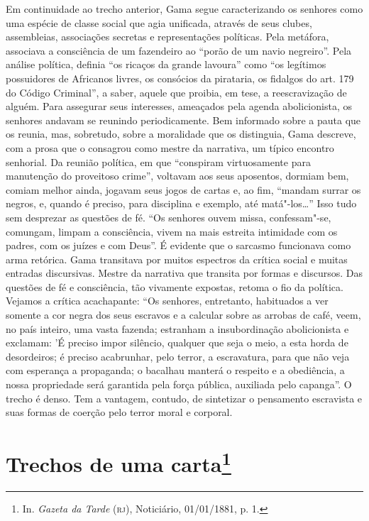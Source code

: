 {\small\noindent
Em continuidade ao trecho anterior, Gama segue caracterizando os
senhores como uma espécie de classe social que agia unificada, através
de seus clubes, assembleias, associações secretas e representações
políticas. Pela metáfora, associava a consciência de um fazendeiro ao
``porão de um navio negreiro''. Pela análise política, definia ``os ricaços
da grande lavoura'' como ``os legítimos possuidores de Africanos livres,
os consócios da pirataria, os fidalgos do art. 179 do Código Criminal'',
a saber, aquele que proibia, em tese, a reescravização de alguém. Para
assegurar seus interesses, ameaçados pela agenda abolicionista, os
senhores andavam se reunindo periodicamente. Bem informado sobre a pauta
que os reunia, mas, sobretudo, sobre a moralidade que os distinguia, Gama
descreve, com a prosa que o consagrou como mestre da narrativa, um
típico encontro senhorial. Da reunião política, em que ``conspiram
virtuosamente para manutenção do proveitoso crime'', voltavam aos seus
aposentos, dormiam bem, comiam melhor ainda, jogavam seus jogos de
cartas e, ao fim, ``mandam surrar os negros, e, quando é preciso, para
disciplina e exemplo, até matá"-los\ldots{}'' Isso tudo sem desprezar as
questões de fé. ``Os senhores ouvem missa, confessam"-se, comungam, limpam
a consciência, vivem na mais estreita intimidade com os padres, com os
juízes e com Deus''. É evidente que o sarcasmo funcionava como arma
retórica. Gama transitava por muitos espectros da crítica social e
muitas entradas discursivas. Mestre da
narrativa que transita por formas e discursos. Das questões de fé e
consciência, tão vivamente expostas, retoma o fio da política. Vejamos a
crítica acachapante: ``Os senhores, entretanto, habituados a ver somente
a cor negra dos seus escravos e a calcular sobre as arrobas de café,
veem, no país inteiro, uma vasta fazenda; estranham a insubordinação
abolicionista e exclamam: 'É preciso impor silêncio, qualquer que seja o
meio, a esta horda de desordeiros; é preciso acabrunhar, pelo terror, a
escravatura, para que não veja com esperança a propaganda; o bacalhau
manterá o respeito e a obediência, a nossa propriedade será garantida
pela força pública, auxiliada pelo capanga''. O trecho é denso. Tem a
vantagem, contudo, de sintetizar o pensamento escravista e suas formas
de coerção pelo terror moral e corporal. }

\chapter{Trechos de uma carta\footnote[*]{In. \emph{Gazeta da Tarde}
  (\textsc{rj}), Noticiário, 01/01/1881, p. 1.}}

